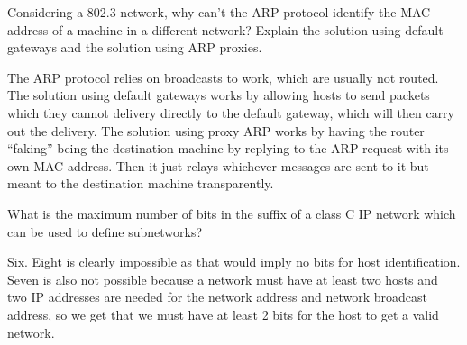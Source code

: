 \begin{Exercise}
Considering a 802.3 network, why can't the ARP protocol identify the MAC address of a machine in a different network?
Explain the solution using default gateways and the solution using ARP proxies.
\end{Exercise}
\begin{Answer}
The ARP protocol relies on broadcasts to work, which are usually not routed.
The solution using default gateways works by allowing hosts to send packets which they cannot delivery directly to the default gateway, which will then carry out the delivery.
The solution using proxy ARP works by having the router ``faking'' being the destination machine by replying to the ARP request with its own MAC address. Then it just relays whichever messages are sent to it but meant to the destination machine transparently.
\end{Answer}

\begin{Exercise}
What is the maximum number of bits in the suffix of a class C IP network which can be used to define subnetworks?
\end{Exercise}
\begin{Answer}
Six.
Eight is clearly impossible as that would imply no bits for host identification.
Seven is also not possible because a network must have at least two hosts and two IP addresses are needed for the network address and network broadcast address, so we get that we must have at least 2 bits for the host to get a valid network.
\end{Answer}

